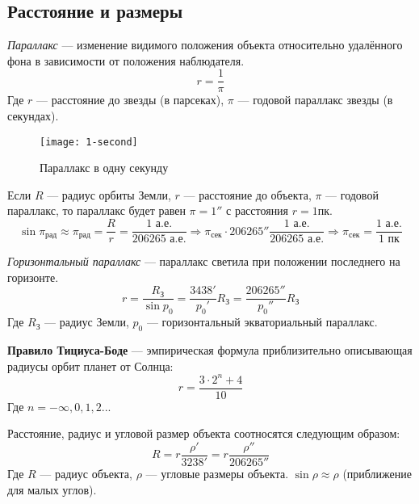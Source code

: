 \subsection{Расстояние и размеры}
\textit{Параллакс} --- изменение видимого положения объекта относительно удалённого фона в зависимости от положения наблюдателя.
\begin{equation}r=\frac{1}{\pi}
\end{equation}
Где $r$ --- расстояние до звезды (в парсеках), $\pi$ --- годовой параллакс звезды (в секундах).
\begin{figure}[!h]
\centering
\texttt{[image: 1-second]}
\caption{Параллакс в одну секунду}
\end{figure}

Если $R$ --- радиус орбиты Земли, $r$ --- расстояние до объекта, $\pi$ --- годовой параллакс, то параллакс будет равен $\pi=1''$ с расстояния $r=1$пк.
$$\sin\pi_{\text{рад}}\approx\pi_{\text{рад}}=\frac{R}{r}=\frac{1\text{ а.е.}}{206265\text{ а.е.}}\Rightarrow\pi_{\text{сек}}\cdot 206265''\frac{1\text{ а.е.}}{206265\text{ а.е.}}\Rightarrow\pi_{\text{сек}}=\frac{1\text{ а.е.}}{1\text{ пк}}$$

\textit{Горизонтальный параллакс} --- параллакс светила при положении последнего на горизонте.
\begin{equation}r=\frac{R_{\text{З}}}{\sin p_0}=\frac{3438'}{p_0'}R_{\text{З}}=\frac{206265''}{p_0''}R_{\text{З}}
\end{equation}
Где $R_{\text{З}}$ --- радиус Земли, $p_0$ --- горизонтальный экваториальный параллакс.

\textbf{Правило Тициуса-Боде} --- эмпирическая формула приблизительно описывающая радиусы орбит планет от Солнца:
\begin{equation}r=\frac{3\cdot 2^n+4}{10}
\end{equation}
Где $n=-\infty, 0, 1, 2...$

Расстояние, радиус и угловой размер объекта соотносятся следующим образом:
\begin{equation}R=r\frac{\rho'}{3238'}=r\frac{\rho''}{206265''}
\end{equation}
Где $R$ --- радиус объекта, $\rho$ --- угловые размеры объекта. $\sin\rho\approx\rho$ (приближение для малых углов).
